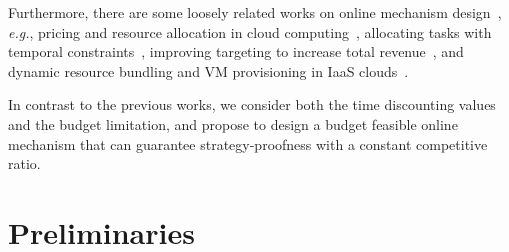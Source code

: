 \documentclass[10pt,journal,letterpaper,compsoc]{IEEEtran}
\newcommand{\eg}{{\em e.g.}}
\newcommand{\et}{{\em et al. }}
\begin{document}
Furthermore, there are some loosely related works on online mechanism design~\cite{Naroditskiy:2013:ROM:2484920.2485023,Kesselheim:2015:SOM:2764468.2764487,Furuhata:2014:COC:2615731.2616027}, \eg,  pricing and resource allocation in cloud computing~\cite{Shi:2014:OAF:2591971.2591980}, allocating tasks with temporal constraints~\cite{nunes2015multi}, improving targeting to increase total revenue~\cite{Hummel:2015:ITI:2736277.2741079}, and dynamic resource bundling and VM provisioning in IaaS clouds~\cite{Zhang:2015:OAI:2796314.2745855}.

In contrast to the previous works, we consider both the time discounting values and the budget limitation, and propose to design a budget feasible online mechanism that can guarantee strategy-proofness with a constant competitive ratio.



\section{Preliminaries}
\end{document}
